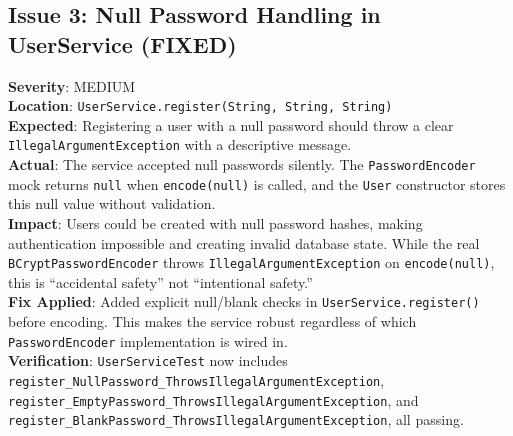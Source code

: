 \documentclass[11pt]{article}
\begin{document}
  \subsection{Issue 3: Null Password Handling in UserService (FIXED)}
  \textbf{Severity}: MEDIUM \\
  \textbf{Location}: \texttt{UserService.register(String, String, String)} \\
  \textbf{Expected}: Registering a user with a null password should throw a clear \texttt{IllegalArgumentException} with a descriptive message. \\
  \textbf{Actual}: The service accepted null passwords silently. The \texttt{PasswordEncoder} mock returns \texttt{null} when \texttt{encode(null)} is called, and the \texttt{User} constructor stores this null value without validation. \\
  \textbf{Impact}: Users could be created with null password hashes, making authentication impossible and creating invalid database state. While the real \texttt{BCryptPasswordEncoder} throws \texttt{IllegalArgumentException} on \texttt{encode(null)}, this is ``accidental safety'' not ``intentional safety.'' \\
  \textbf{Fix Applied}: Added explicit null/blank checks in \texttt{UserService.register()} before encoding. This makes the service robust regardless of which \texttt{PasswordEncoder} implementation is wired in. \\
  \textbf{Verification}: \texttt{UserServiceTest} now includes \texttt{register\_NullPassword\_ThrowsIllegalArgumentException}, \texttt{register\_EmptyPassword\_ThrowsIllegalArgumentException}, and \texttt{register\_BlankPassword\_ThrowsIllegalArgumentException}, all passing.
\end{document}

